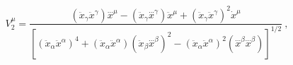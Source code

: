 \begin{equation} \label{l81-4}
V_{2}^{\mu}=\frac{(\ddot x_{\gamma}\ddot x^{\gamma})\stackrel{...}x^{\mu}- (\ddot x_{\gamma}\stackrel{...}x^{\gamma})\ddot x^{\mu} +(\ddot x_{\gamma}\ddot x^{\gamma})^2\dot x ^{\mu}}
{[(\ddot x_{\alpha}\ddot x^{\alpha})^4+(\ddot x_{\alpha}\ddot x^{\alpha})(\ddot x_{\beta}\stackrel{...}x^{\beta})^2-
(\ddot x_{\alpha}\ddot x^{\alpha})^2(\stackrel{...}x^{\beta}\stackrel{...}x^{\beta})]^{1/2}}~,
\end{equation}

